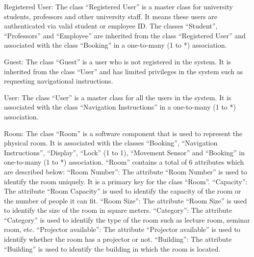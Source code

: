 \documentclass[conference,onecolumn]{IEEEtran}
\begin{document}
		Registered User: The class ``Registered User'' is a master class for university students, professors and other university staff. It means these users are authenticated via valid student or employee ID. The classes ``Student'', ``Professors'' and ``Employee'' are inherited from the class ``Registered User'' and associated with the class ``Booking'' in a one-to-many (1 to *) association.

		Guest: The class ``Guest'' is a user who is not registered in the system. It is inherited from the class ``User'' and has limited privileges in the system such as requesting navigational instructions.

		User: The class ``User'' is a master class for all the users in the system. It is associated with the class ``Navigation Instructions'' in a one-to-many (1 to *) association.

		Room: The class ``Room'' is a software component that is used to represent the physical room. It is associated with the classes ``Booking'', ``Navigation Instructions'', ``Display'', ``Lock'' (1 to 1), ``Movement Sensor'' and ``Booking'' in one-to-many (1 to *) association. ``Room'' contains a total of 6 attributes which are described below:
		``Room Number'': The attribute ``Room Number'' is used to identify the room uniquely. It is a primary key for the class ``Room''.
		``Capacity'': The attribute ``Room Capacity'' is used to identify the capacity of the room or the number of people it can fit.
		``Room Size'': The attribute ``Room Size'' is used to identify the size of the room in square meters.
		``Category'': The attribute ``Category'' is used to identify the type of the room such as lecture room, seminar room, etc.
		``Projector available'': The attribute ``Projector available'' is used to identify whether the room has a projector or not.
		``Building'': The attribute ``Building'' is used to identify the building in which the room is located.


\end{document}
